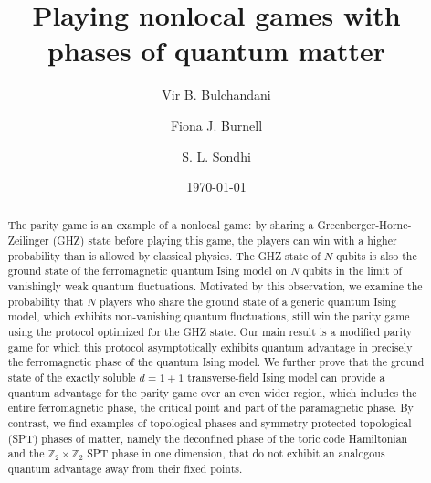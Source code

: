 \documentclass[prb,twocolumn,showpacs,amssymb,superscriptaddress]{revtex4-2}
\date{\today}
\begin{document}
\title{Playing nonlocal games with phases of quantum matter}

\author{Vir B. Bulchandani}

\author{Fiona J. Burnell}

\author{S. L. Sondhi}

\begin{abstract}

The parity game is an example of a nonlocal game: by sharing a Greenberger-Horne-Zeilinger (GHZ) state before playing this game, the players can win with a higher probability than is allowed by classical physics. The GHZ state of $N$ qubits is also the ground state of the ferromagnetic quantum Ising model on $N$ qubits in the limit of vanishingly weak quantum fluctuations. Motivated by this observation, we examine the probability that $N$ players who share the ground state of a generic quantum Ising model, which exhibits non-vanishing quantum fluctuations, still win the parity game using the protocol optimized for the GHZ state. Our main result is a modified parity game for which this protocol asymptotically exhibits quantum advantage in precisely the ferromagnetic phase of the quantum Ising model. We further prove that the ground state of the exactly soluble $d=1+1$ transverse-field Ising model can provide a quantum advantage for the parity game over an even wider region, which includes the entire ferromagnetic phase, the critical point and part of the paramagnetic phase. By contrast, we find examples of topological phases and symmetry-protected topological (SPT) phases of matter, namely the deconfined phase of the toric code Hamiltonian and the $\mathbb{Z}_2 \times \mathbb{Z}_2$ SPT phase in one dimension, that do not exhibit an analogous quantum advantage away from their fixed points.
\end{abstract}

\maketitle
\end{document}
